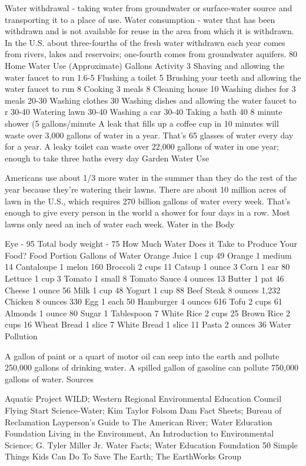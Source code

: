 \documentclass{article}
\begin{document}
Water withdrawal - taking water from groundwater or surface-water source and transporting it to a place of use.
Water consumption - water that has been withdrawn and is not available for reuse in the area from which it is withdrawn.
In the U.S. about three-fourths of the fresh water withdrawn each year comes from rivers, lakes and reservoirs; one-fourth comes from groundwater aquifers.
80%
Home Water Use (Approximate)
Gallons	Activity
3	Shaving and allowing the water faucet to run
1.6-5	Flushing a toilet
5	Brushing your teeth and allowing the water faucet to run
8	Cooking 3 meals
8	Cleaning house
10	Washing dishes for 3 meals
20-30	Washing clothes
30	Washing dishes and allowing the water faucet to r
30-40	Watering lawn
30-40	Washing a car
30-40	Taking a bath
40	8 minute shower (5 gallons/minute
A leak that fills up a coffee cup in 10 minutes will waste over 3,000 gallons of water in a year. That's 65 glasses of water every day for a year.
A leaky toilet can waste over 22,000 gallons of water in one year; enough to take three baths every day
Garden Water Use

Americans use about 1/3 more water in the summer than they do the rest of the year because they're watering their lawns.
There are about 10 million acres of lawn in the U.S., which requires 270 billion gallons of water every week. That's enough to give every person in the world a shower for four days in a row.
Most lawns only need an inch of water each week.
Water in the Body

Eye - 95%
Total body weight - 75%
How Much Water Does it Take to Produce Your Food?
Food	Portion	Gallons of Water
Orange Juice	1 cup	49
Orange	1 medium	14
Cantaloupe	1 melon	160
Broccoli	2 cups	11
Catsup	1 ounce	3
Corn	1 ear	80
Lettuce	1 cup	3
Tomato	1 small	8
Tomato Sauce	4 ounces	13
Butter	1 pat	46
Cheese	1 ounce	56
Milk	1 cup	48
Yogurt	1 cup	88
Beef Steak	8 ounces	1,232
Chicken	8 ounces	330
Egg	1 each	50
Hamburger	4 ounces	616
Tofu	2 cups	61
Almonds	1 ounce	80
Sugar	1 Tablespoon	7
White Rice	2 cups	25
Brown Rice	2 cups	16
Wheat Bread	1 slice	7
White Bread	1 slice	11
Pasta	2 ounces	36
Water Pollution

A gallon of paint or a quart of motor oil can seep into the earth and pollute 250,000 gallons of drinking water.
A spilled gallon of gasoline can pollute 750,000 gallons of water.
Sources

Aquatic Project WILD; Western Regional Environmental Education Council
Flying Start Science-Water; Kim Taylor
Folsom Dam Fact Sheets; Bureau of Reclamation
Layperson's Guide to The American River; Water Education Foundation
Living in the Environment, An Introduction to Environmental Science; G. Tyler Miller Jr.
Water Facts; Water Education Foundation
50 Simple Things Kids Can Do To Save The Earth; The EarthWorks Group
\end{document}
